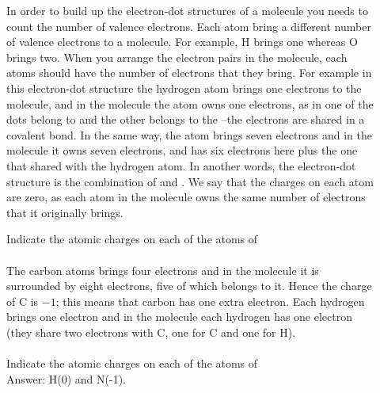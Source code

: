 \documentclass[main.tex]{subfiles}
\begin{document}
\begin{description}
\item[] In order to build up the electron-dot structures of a molecule you needs to count the number of valence electrons. Each atom bring a different number of valence electrons to a molecule. For example, H brings one whereas O brings two. When you arrange the electron pairs in the molecule, each atoms should have the number of electrons that they bring. For example in this electron-dot structure \hspace{.05in}\hspace{.05in} the hydrogen atom brings one electrons to the molecule, and in the molecule the atom owns one electrons, as in \hspace{.05in}  one of the dots belong to  and the other belongs to the --the electrons are shared in a covalent bond. In the same way, the  atom brings seven electrons and in the molecule it owns seven electrons, and has six electrons here \hspace{.05in} plus the one that shared with the hydrogen atom. In another words, the \hspace{.05in}\hspace{.05in} electron-dot structure is the combination of \hspace{.05in} and \hspace{.05in}\hspace{.05in}. We say that the charges on each atom are zero, as each atom in the molecule owns the same number of electrons that it originally brings.
\begin{example} %
Indicate the atomic charges on each of the atoms of  \\
\\
The carbon atoms brings four electrons and in the molecule it is surrounded by eight electrons, five of which belongs to it. Hence the charge of C is $-1$; this means that carbon has one extra electron. Each hydrogen brings one electron and in the molecule each hydrogen has one electron (they share two electrons with C, one for C and one for H). \\
\faDiamond\ \\
Indicate the atomic charges on each of the atoms of \\
\flushright Answer: H(0) and N(-1). 
\end{example}%



\end{description}
\end{document}

